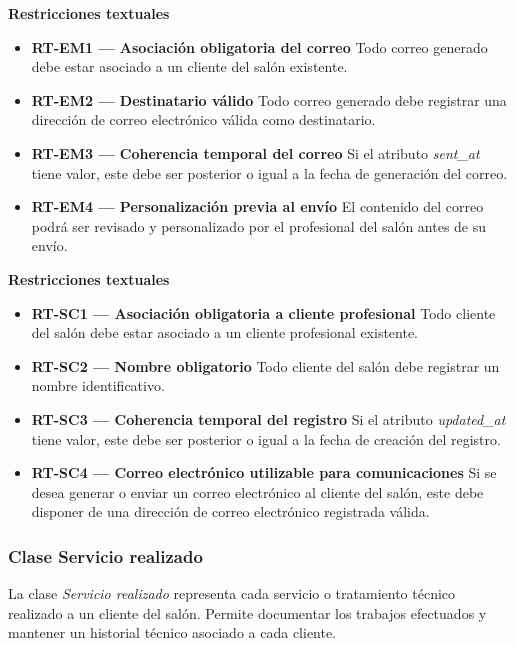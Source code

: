 \textbf{Restricciones textuales}

\begin{itemize}

      \item \textbf{RT-EM1 — Asociación obligatoria del correo}
            Todo correo generado debe estar asociado a un cliente del salón existente.
      \item \textbf{RT-EM2 — Destinatario válido}
            Todo correo generado debe registrar una dirección de correo electrónico válida como destinatario.
      \item \textbf{RT-EM3 — Coherencia temporal del correo}
            Si el atributo \textit{sent\_at} tiene valor, este debe ser posterior o igual a la fecha de generación del correo.
      \item \textbf{RT-EM4 — Personalización previa al envío}
            El contenido del correo podrá ser revisado y personalizado por el profesional del salón antes de su envío.
\end{itemize}

\textbf{Restricciones textuales}

\begin{itemize}

      \item \textbf{RT-SC1 — Asociación obligatoria a cliente profesional}
            Todo cliente del salón debe estar asociado a un cliente profesional existente.
      \item \textbf{RT-SC2 — Nombre obligatorio}
            Todo cliente del salón debe registrar un nombre identificativo.
      \item \textbf{RT-SC3 — Coherencia temporal del registro}
            Si el atributo \textit{updated\_at} tiene valor, este debe ser posterior o igual a la fecha de creación del registro.
      \item \textbf{RT-SC4 — Correo electrónico utilizable para comunicaciones}
            Si se desea generar o enviar un correo electrónico al cliente del salón, este debe disponer de una dirección de correo electrónico registrada válida.
\end{itemize}

\subsubsection{Clase Servicio realizado}

La clase \textit{Servicio realizado} representa cada servicio o tratamiento técnico realizado a un cliente del salón. Permite documentar los trabajos efectuados y mantener un historial técnico asociado a cada cliente.

